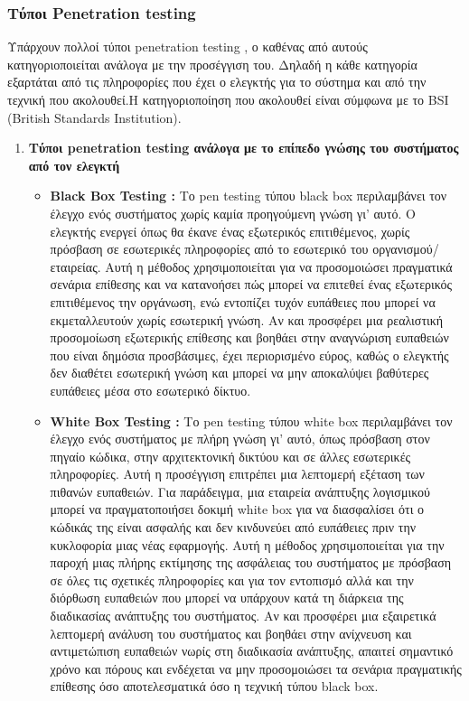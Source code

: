 \subsubsection{\gt Τύποι \lt Penetration testing}
{ 
\hspace*{2em} Υπάρχουν πολλοί τύποι \lt penetration testing \gt , ο καθένας από αυτούς κατηγοριοποιείται ανάλογα με την προσέγγιση του. Δηλαδή η κάθε κατηγορία εξαρτάται από τις πληροφορίες που έχει ο ελεγκτής για το σύστημα  και από την τεχνική που ακολουθεί.Η κατηγοριοποίηση που ακολουθεί είναι σύμφωνα με το \lt BSI (British Standards Institution). \gt
\begin{enumerate}
    \item{\textbf{ Τύποι \lt penetration testing \gt ανάλογα με το επίπεδο γνώσης του  συστήματος από τον ελεγκτή }}
    \begin{itemize}
        \item \lt \textbf{Black Box Testing :} \gt Το \lt pen testing \gt τύπου \lt black box \gt περιλαμβάνει τον έλεγχο ενός συστήματος χωρίς καμία προηγούμενη γνώση γι' αυτό. Ο ελεγκτής ενεργεί όπως θα έκανε ένας εξωτερικός επιτιθέμενος, χωρίς πρόσβαση σε εσωτερικές πληροφορίες από το εσωτερικό του οργανισμού/εταιρείας. Αυτή η μέθοδος χρησιμοποιείται για να προσομοιώσει πραγματικά σενάρια επίθεσης και να κατανοήσει πώς μπορεί να επιτεθεί ένας εξωτερικός επιτιθέμενος την οργάνωση, ενώ εντοπίζει τυχόν ευπάθειες που μπορεί να εκμεταλλευτούν χωρίς εσωτερική γνώση. Αν και προσφέρει μια ρεαλιστική προσομοίωση εξωτερικής επίθεσης και βοηθάει στην αναγνώριση ευπαθειών που είναι δημόσια προσβάσιμες, έχει περιορισμένο εύρος, καθώς ο ελεγκτής δεν διαθέτει εσωτερική γνώση και μπορεί να μην αποκαλύψει βαθύτερες ευπάθειες μέσα στο εσωτερικό δίκτυο.
        \item \lt \textbf{White Box Testing :} \gt Το \lt pen testing \gt τύπου \lt white box περιλαμβάνει τον έλεγχο ενός συστήματος με πλήρη γνώση γι' αυτό, όπως πρόσβαση στον πηγαίο κώδικα, στην αρχιτεκτονική δικτύου και σε άλλες εσωτερικές πληροφορίες. Αυτή η προσέγγιση επιτρέπει μια λεπτομερή εξέταση των πιθανών ευπαθειών. Για παράδειγμα, μια εταιρεία ανάπτυξης λογισμικού μπορεί να πραγματοποιήσει δοκιμή white box για να διασφαλίσει ότι ο κώδικάς της είναι ασφαλής και δεν κινδυνεύει από ευπάθειες πριν την κυκλοφορία μιας νέας εφαρμογής. Αυτή η μέθοδος χρησιμοποιείται για την παροχή μιας πλήρης εκτίμησης της ασφάλειας του συστήματος  με πρόσβαση σε όλες τις σχετικές πληροφορίες και για τον εντοπισμό αλλά και την διόρθωση ευπαθειών που μπορεί να υπάρχουν κατά τη διάρκεια της διαδικασίας ανάπτυξης του συστήματος. Αν και προσφέρει μια εξαιρετικά λεπτομερή ανάλυση του συστήματος και βοηθάει στην ανίχνευση και αντιμετώπιση ευπαθειών νωρίς στη διαδικασία ανάπτυξης, απαιτεί σημαντικό χρόνο και πόρους και ενδέχεται να μην προσομοιώσει τα σενάρια πραγματικής επίθεσης όσο αποτελεσματικά όσο η τεχνική τύπου \lt black box.

\end{itemize}
\end{enumerate}}
